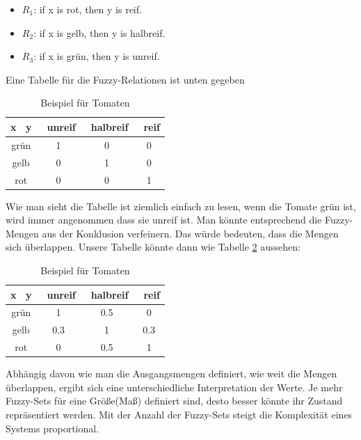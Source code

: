 \begin{itemize}
	\item $R_1$: if x is rot, then y is reif.
	\item $R_2$: if x is gelb, then y is halbreif.
	\item $R_3$: if x is grün, then y is unreif.
\end{itemize}

Eine Tabelle für die Fuzzy-Relationen ist unten gegeben

\begin{table}\label{tomato:1}
	\centering
	\begin{tabular}{c|c c c}
		
		x \diagdown \ y & \ unreif & \ halbreif & \ reif \\ [0.5ex]
		\hline
		grün & 1 & 0 & 0 \\ 
		gelb & 0 & 1 & 0\\
		rot  & 0 & 0 & 1\\
		
	\end{tabular}
	\caption{Beispiel für Tomaten}
	
\end{table}

Wie man sieht die Tabelle ist ziemlich einfach zu lesen, wenn die Tomate grün ist, wird immer angenommen dass sie unreif ist. Man könnte entsprechend die Fuzzy-Mengen aus der Konklusion verfeinern. Das würde bedeuten, dass die Mengen sich überlappen. Unsere Tabelle könnte dann wie Tabelle \ref{table:1} aussehen:

\begin{table}
	\centering
	\begin{tabular}{c|c c c}
		
		x \diagdown \ y & \ unreif & \ halbreif & \ reif \\ [0.5ex]
		\hline
		grün & 1 & 0.5 & 0 \\ 
		gelb & 0.3 & 1 & 0.3\\
		rot  & 0 & 0.5 & 1\\
		
	\end{tabular}
	\caption{Beispiel für Tomaten}
	\label{table:1}
\end{table}

Abhängig davon wie man die Ausgangsmengen definiert, wie weit die Mengen überlappen, ergibt sich eine unterschiedliche Interpretation der Werte. Je mehr Fuzzy-Sets für eine Größe(Maß) definiert sind, desto besser könnte ihr Zustand repräsentiert werden. Mit der Anzahl der Fuzzy-Sets steigt die Komplexität eines Systems proportional.

